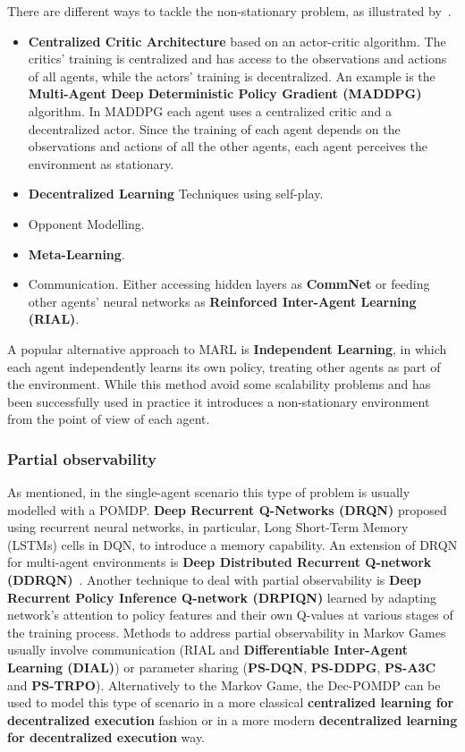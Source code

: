 \documentclass[11pt, a4paper, hidelinks]{report}
\begin{document}
There are different ways to tackle the non-stationary problem, as illustrated by~\citep{papoudakis2019dealing}.
\begin{itemize}
	\item \textbf{Centralized Critic Architecture} based on an actor-critic algorithm.
The critics' training is centralized and has access to the observations and actions of all agents, while the actors' training is decentralized.
An example is the \textbf{Multi-Agent Deep Deterministic Policy Gradient (MADDPG)} algorithm.
In MADDPG each agent uses a centralized critic and a decentralized actor.
Since the training of each agent depends on the observations and actions of all the other agents, each agent perceives the environment as stationary.
	\item \textbf{Decentralized Learning} Techniques using self-play.
	\item Opponent Modelling.
	\item \textbf{Meta-Learning}.
	\item Communication.
Either accessing hidden layers as \textbf{CommNet} or feeding other agents' neural networks as \textbf{Reinforced Inter-Agent Learning (RIAL)}.
\end{itemize}

A popular alternative approach to MARL is \textbf{Independent Learning}, in which each agent independently learns its own policy, treating other agents as part of the environment.
While this method avoid some scalability problems and has been successfully used in practice it introduces a non-stationary environment from the point of view of each agent.

\subsubsection{Partial observability}
As mentioned, in the single-agent scenario this type of problem is usually modelled with a POMDP\@.
\textbf{Deep Recurrent Q-Networks (DRQN)} proposed using recurrent neural networks, in particular, Long Short-Term Memory (LSTMs) cells in DQN, to introduce a memory capability.
An extension of DRQN for multi-agent environments is \textbf{Deep Distributed Recurrent Q-network (DDRQN)}~\citep{Nguyen_2020}.
Another technique to deal with partial observability is \textbf{Deep Recurrent Policy Inference Q-network (DRPIQN)} learned by adapting network’s attention to policy features and their own Q-values at various stages of the training process.
Methods to address partial observability in Markov Games usually involve communication (RIAL and \textbf{Differentiable Inter-Agent Learning (DIAL)}) or parameter sharing (\textbf{PS-DQN}, \textbf{PS-DDPG}, \textbf{PS-A3C} and \textbf{PS-TRPO}).
Alternatively to the Markov Game, the Dec-POMDP can be used to model this type of scenario in a more classical \textbf{centralized learning for decentralized execution} fashion or in a more modern \textbf{decentralized learning for decentralized execution} way.
\end{document}
